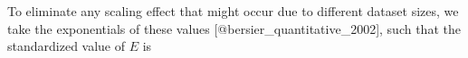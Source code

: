 To eliminate any scaling effect that might occur due to different dataset
sizes, we take the exponentials of these values [@bersier_quantitative_2002],
such that the standardized value of $E$ is
